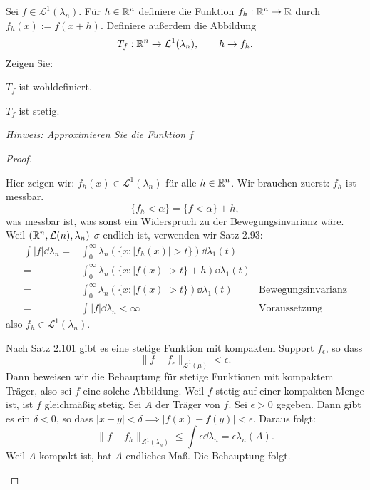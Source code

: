 \begin{Problem}
	Sei $f\in \mathcal{L}^1(\lambda_n)$. F\"{u}r $h\in \mathbb{R}^n$ definiere die Funktion $f_h:\mathbb{R}^n\to \mathbb{R}$ durch $f_h(x):=f(x+h)$. Definiere außerdem die Abbildung
	\[
	T_f:\mathbb{R}^n\to \mathcal{L}^1(\lambda_n),\qquad h\to f_h
	.\] 
	Zeigen Sie:
	\begin{parts}
		\item $T_f$ ist wohldefiniert.
		\item $T_f$ ist stetig.
	\end{parts}
{\footnotesize \emph{Hinweis: Approximieren Sie die Funktion }$f$ }
\end{Problem}

\begin{proof}
	\begin{parts}
	\item Hier zeigen wir: $f_h(x)\in \mathcal{L}^1(\lambda_n)$ f\"{u}r alle $h\in \mathbb{R}^n$. Wir brauchen zuerst: $f_h$ ist messbar. 
		\[
	\{f_h<\alpha\} =\{f<\alpha\} +h
,\]
		was messbar ist, was sonst ein Widerspruch zu der Bewegungsinvarianz wäre. Weil $(\mathbb{R}^n, \mathcal{L}(n), \lambda_n)$ $\sigma$-endlich ist, verwenden wir Satz 2.93:
		\begin{align*}
			\int |f|\dd{\lambda_n}=&\int_0^\infty \lambda_n(\{x:|f_h(x)|>t\})\dd{\lambda_1(t)}\\
			=&\int_0^\infty \lambda_n(\{x:|f(x)|>t\} +h)\dd{\lambda_1(t)}\\
			=&\int_0^\infty \lambda_n(\{x:|f(x)|>t\})\dd{\lambda_1(t)} & \text{Bewegungsinvarianz}\\
			=&\int |f|\dd{\lambda_n}<\infty & \text{Voraussetzung}
		\end{align*}
also $f_h\in \mathcal{L}^1(\lambda_n)$.
\item 
Nach Satz 2.101 gibt es eine stetige Funktion mit kompaktem Support $f_\epsilon$, so dass
	\[
		\|f-f_\epsilon\|_{\mathcal{L}^1(\mu)}<\epsilon
	.\] 
	Dann beweisen wir die Behauptung für stetige Funktionen mit kompaktem Träger, also sei $f$ eine solche Abbildung. Weil $f$ stetig auf einer kompakten Menge ist, ist $f$ gleichmäßig stetig. Sei $A$ der Träger von $f$. Sei $\epsilon>0$ gegeben. Dann gibt es ein $\delta<0$, so dass $|x-y|<\delta\implies |f(x)-f(y)|<\epsilon$. Daraus folgt:
	\[
		\|f-f_h\|_{\mathcal{L}^1(\lambda_n)}\le \int \epsilon\dd{\lambda_n}=\epsilon\lambda_n(A)
	.\] 
	Weil $A$ kompakt ist, hat $A$ endliches Maß. Die Behauptung folgt.


\end{parts}
\end{proof}
